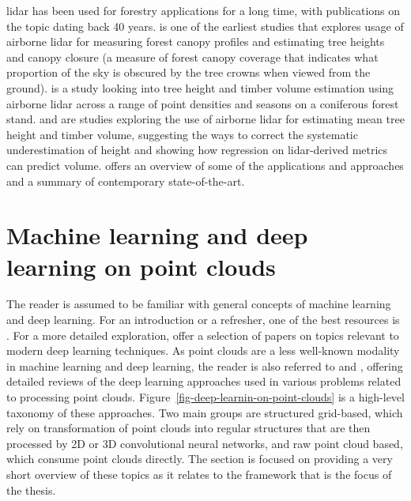 \gls{lidar} has been used for forestry applications for a long time, with publications on the topic dating back 40 years.
\citet{nelsonDeterminingForestCanopy1984} is one of the earliest studies that explores usage of airborne \gls{lidar} for measuring forest canopy profiles and estimating tree heights and canopy closure (a measure of forest canopy coverage that indicates what proportion of the sky is obscured by the tree crowns when viewed from the ground).
\citet{nilssonEstimationTreeHeights1996} is a study looking into tree height and timber volume estimation using airborne \gls{lidar} across a range of point densities and seasons on a coniferous forest stand.
\citet{naessetDeterminationMeanTree1997} and \citet{naessetEstimatingTimberVolume1997} are studies exploring the use of airborne \gls{lidar} for estimating mean tree height and timber volume, suggesting the ways to correct the systematic underestimation of height and showing how regression on \gls{lidar}-derived metrics can predict volume.
\citet{carson2004lidar} offers an overview of some of the applications and approaches and a summary of contemporary state-of-the-art.

\section{Machine learning and deep learning on point clouds}\label{sec-ml-dl}

The reader is assumed to be familiar with general concepts of machine learning and deep learning.
For an introduction or a refresher, one of the best resources is \citet{goodfellowDeepLearning2016}.
For a more detailed exploration, \citet{wangRecentAdvancesDeep2020} offer a selection of papers on topics relevant to modern deep learning techniques.
As point clouds are a less well-known modality in machine learning and deep learning, the reader is also referred to \citet{belloReviewDeepLearning2020} and \citet{guoDeepLearning3D2021}, offering detailed reviews of the deep learning approaches used in various problems related to processing point clouds.
Figure~\ref{fig-deep-learnin-on-point-clouds} is a high-level taxonomy of these approaches.
Two main groups are structured grid-based, which rely on transformation of point clouds into regular structures that are then processed by 2D or 3D convolutional neural networks, and raw point cloud based, which consume point clouds directly.
The section is focused on providing a very short overview of these topics as it relates to the framework that is the focus of the thesis.

